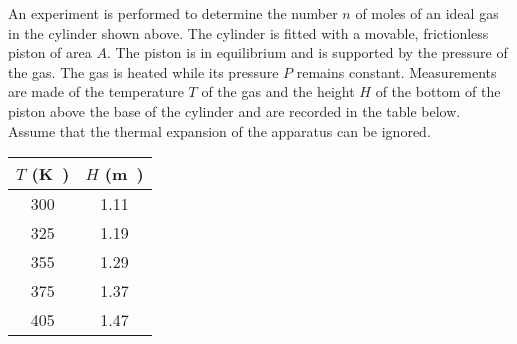 \documentclass{../../oss-apphys-exam}
\begin{document}
\begin{questions}
  \newpage
  
  
  
  \question An experiment is performed to determine the number $n$ of moles of
  an ideal gas in the cylinder shown above. The cylinder is fitted with a
  movable, frictionless piston of area $A$. The piston is in equilibrium and is
  supported by the pressure of the gas. The gas is heated while its pressure
  $P$ remains constant. Measurements are made of the temperature $T$ of the gas
  and the height $H$ of the bottom of the piston above the base of the cylinder
  and are recorded in the table below. Assume that the thermal expansion of the
  apparatus can be ignored.
  \begin{center}
    \begin{tabular}{|c|c|}
      \hline
      $T$ (\si\kelvin) & $H$ (\si\metre) \\ \hline\hline
      300 & 1.11 \\
      325 & 1.19 \\
      355 & 1.29 \\
      375 & 1.37 \\
      405 & 1.47 \\
      \hline
    \end{tabular}
  \end{center}
\end{questions}
\end{document}
